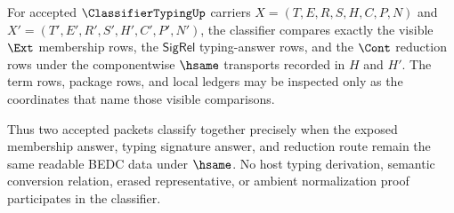 \begin{definition}
\label{def:classifier-typing-classifier}
For accepted $\ClassifierTypingUp$ carriers $X=(T,E,R,S,H,C,P,N)$ and $X'=(T',E',R',S',H',C',P',N')$, the classifier compares exactly the visible $\Ext$ membership rows, the $\mathsf{SigRel}$ typing-answer rows, and the $\Cont$ reduction rows under the componentwise $\hsame$ transports recorded in $H$ and $H'$. The term rows, package rows, and local ledgers may be inspected only as the coordinates that name those visible comparisons.

Thus two accepted packets classify together precisely when the exposed membership answer, typing signature answer, and reduction route remain the same readable BEDC data under $\hsame$. No host typing derivation, semantic conversion relation, erased representative, or ambient normalization proof participates in the classifier.
\end{definition}


